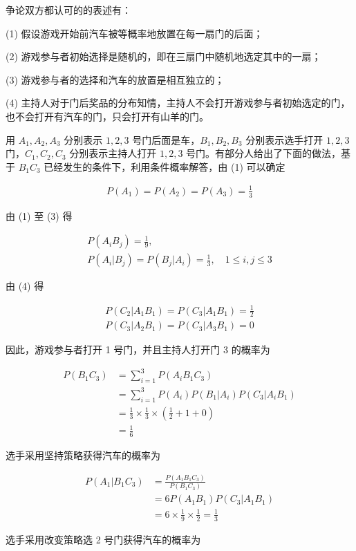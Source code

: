 争论双方都认可的的表述有：
\par{(1) 假设游戏开始前汽车被等概率地放置在每一扇门的后面；}
\par{(2) 游戏参与者初始选择是随机的，即在三扇门中随机地选定其中的一扇；}
\par{(3) 游戏参与者的选择和汽车的放置是相互独立的；}
\par{(4) 主持人对于门后奖品的分布知情，主持人不会打开游戏参与者初始选定的门，也不会打开有汽车的门，只会打开有山羊的门。}

用 $A_1,A_2,A_3$ 分别表示 $1,2,3$ 号门后面是车，$B_1,B_2,B_3$ 分别表示选手打开 $1,2,3$ 门，$C_1,C_2,C_3$ 分别表示主持人打开 $1,2,3$ 号门。有部分人给出了下面的做法，基于 $B_1C_3$ 已经发生的条件下，利用条件概率解答，由 (1) 可以确定

\begin{align}
P(A_1)=P(A_2)=P(A_3)=\frac{1}{3}
\end{align}

由 (1) 至 (3) 得

\begin{gather}
P(A_iB_j)=\frac{1}{9}, \\
P(A_i|B_j)=P(B_j|A_i)=\frac{1}{3},\quad1\le i,j\le3
\end{gather}

由 (4) 得

\begin{gather} \label{question}
P(C_2|A_1B_1)=P(C_3|A_1B_1)=\frac{1}{2}\\
P(C_3|A_2B_1)=P(C_3|A_3B_1)=0
\end{gather}

因此，游戏参与者打开 1 号门，并且主持人打开门 3 的概率为

\begin{align*}
P(B_1C_3)&=\sum_{i=1}^3P(A_iB_1C_3)\\
&=\sum_{i=1}^3P(A_i)P(B_1|A_i)P(C_3|A_iB_1)\\
&=\frac{1}{3}\times\frac{1}{3}\times(\frac{1}{2}+1+0)\\
&=\frac{1}{6}
\end{align*}

选手采用坚持策略获得汽车的概率为

\begin{align*}
P(A_1|B_1C_3)&=\frac{P(A_1B_1C_3)}{P(B_1C_3)}\\
&=6P(A_1B_1)P(C_3|A_1B_1)\\
&=6\times\frac{1}{9}\times\frac{1}{2}=\frac{1}{3}
\end{align*}

选手采用改变策略选 2 号门获得汽车的概率为

